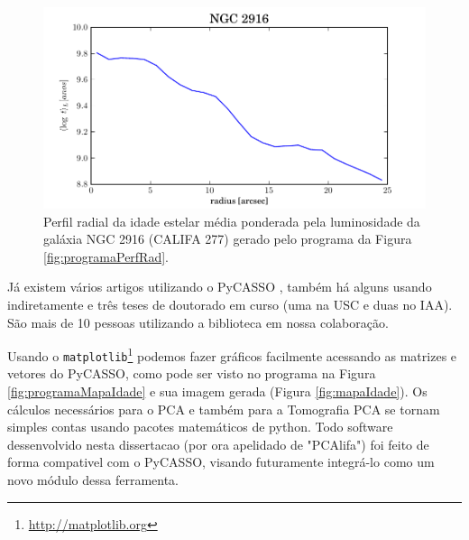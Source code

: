 \begin{figure}
	\includegraphics{figuras/at_flux_radprof.pdf}
	\caption[Perfil radial da idade estelar média da galáxia NGC 2916]
	{Perfil radial da idade estelar média ponderada pela luminosidade da galáxia
	NGC 2916 (CALIFA 277) gerado pelo programa da Figura \ref{fig:programaPerfRad}.}
	\label{fig:perfRad}
\end{figure}

Já existem vários artigos utilizando o PyCASSO \citep{CidFernandes2013, CidFernandes2014, Perez2013,
GonzalezDelgado2013}, também há alguns usando indiretamente \citep{Husemann2013, IglesiasParamo2013} e três teses de
doutorado em curso (uma na USC e duas no IAA). São mais de 10 pessoas utilizando a biblioteca em nossa colaboração.

Usando o \texttt{matplotlib}\footnote{\url{http://matplotlib.org}} podemos fazer gráficos facilmente acessando as
matrizes e vetores do PyCASSO, como pode ser visto no programa na Figura \ref{fig:programaMapaIdade} e sua imagem gerada
(Figura \ref{fig:mapaIdade}). Os cálculos necessários para o PCA e também para a Tomografia PCA se tornam simples contas
usando pacotes matemáticos de python. Todo software dessenvolvido nesta dissertacao (por ora apelidado de "PCAlifa") foi
feito de forma compativel com o PyCASSO, visando futuramente integrá-lo como um novo módulo dessa ferramenta.

